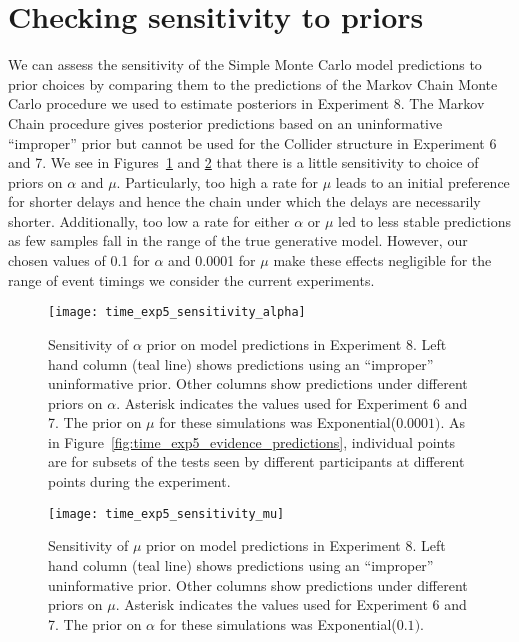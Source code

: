 \section{Checking sensitivity to priors}

We can assess the sensitivity of the Simple Monte Carlo model predictions to prior choices by comparing them to the predictions of the Markov Chain Monte Carlo procedure we used to estimate posteriors in Experiment 8.  The Markov Chain procedure gives posterior predictions based on an uninformative ``improper'' \citep{hartigan2012bayes} prior but cannot be used for the Collider structure in Experiment 6 and 7.  We see in Figures~\ref{fig:time_exp5_sensitivity_alpha} and \ref{fig:time_exp5_sensitivity_mu} that there is a little sensitivity to choice of priors on $\alpha$ and $\mu$.  Particularly, too high a rate for $\mu$ leads to an initial preference for shorter delays and hence the chain under which the delays are necessarily shorter.  Additionally, too low a rate for either $\alpha$ or $\mu$ led to less stable predictions as few samples fall in the range of the true generative model.  However, our chosen values of 0.1 for $\alpha$ and 0.0001 for $\mu$ make these effects negligible for the range of event timings we consider the current experiments.

\begin{figure}[t]
\centering
\texttt{[image: time\_exp5\_sensitivity\_alpha]}
\caption[Experiment 8: Sensitivity of Model Predictions on $\alpha$ Prior]{Sensitivity of $\alpha$ prior on model predictions in Experiment 8.  Left hand column (teal line) shows predictions using an ``improper'' uninformative prior.  Other columns show predictions under different priors on $\alpha$.  Asterisk indicates the values used for Experiment 6 and 7.  The prior on $\mu$ for these simulations was Exponential($0.0001)$.  As in Figure~\ref{fig:time_exp5_evidence_predictions}, individual points are for subsets of the tests seen by different participants at different points during the experiment.}
\label{fig:time_exp5_sensitivity_alpha}
\end{figure}

\begin{figure}[t]
\centering
\texttt{[image: time\_exp5\_sensitivity\_mu]}
\caption[Experiment 8: Sensitivity of Model Predictions on $\mu$ Prior]{Sensitivity of $\mu$ prior on model predictions in Experiment 8.  Left hand column (teal line) shows predictions using an ``improper'' uninformative prior.  Other columns show predictions under different priors on $\mu$.  Asterisk indicates the values used for Experiment 6 and 7.  The prior on $\alpha$ for these simulations was Exponential($0.1)$.}
\label{fig:time_exp5_sensitivity_mu}
\end{figure}

